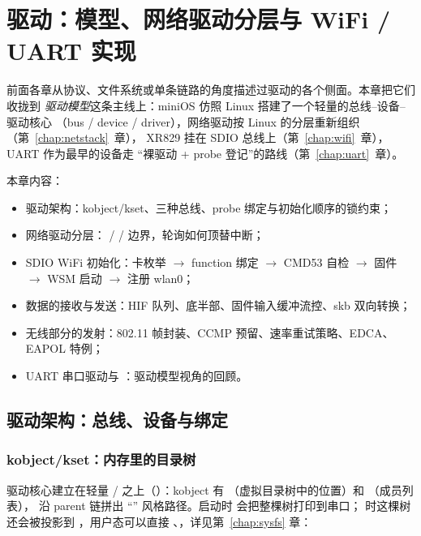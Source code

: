 \chapter{驱动：模型、网络驱动分层与 WiFi / UART 实现}
\label{chap:drivers}

前面各章从协议、文件系统或单条链路的角度描述过驱动的各个侧面。本章把它们收拢到
\emph{驱动模型}这条主线上：miniOS 仿照 Linux 搭建了一个轻量的总线--设备--驱动核心
（bus / device / driver），网络驱动按 Linux 的分层重新组织（第~\ref{chap:netstack}~章），
XR829 挂在 SDIO 总线上（第~\ref{chap:wifi}~章），UART 作为最早的设备走
``裸驱动 + probe 登记''的路线（第~\ref{chap:uart}~章）。

本章内容：

\begin{itemize}
  \item 驱动架构：kobject/kset、三种总线、probe 绑定与初始化顺序的锁约束；
  \item 网络驱动分层： /  / 
        边界，轮询如何顶替中断；
  \item SDIO WiFi 初始化：卡枚举 $\rightarrow$ function 绑定 $\rightarrow$
        CMD53 自检 $\rightarrow$ 固件 $\rightarrow$ WSM 启动 $\rightarrow$ 注册 wlan0；
  \item 数据的接收与发送：HIF 队列、底半部、固件输入缓冲流控、skb 双向转换；
  \item 无线部分的发射：802.11 帧封装、CCMP 预留、速率重试策略、EDCA、EAPOL 特例；
  \item UART 串口驱动与 ：驱动模型视角的回顾。
\end{itemize}

\section{驱动架构：总线、设备与绑定}

\subsection{kobject/kset：内存里的目录树}

驱动核心建立在轻量 / 之上（）：kobject 有
（虚拟目录树中的位置）和 （成员列表），
沿 parent 链拼出 ``'' 风格路径。启动时
 会把整棵树打印到串口； 时这棵树还会被投影到 ，用户态可以直接 、，详见第~\ref{chap:sysfs} 章：


